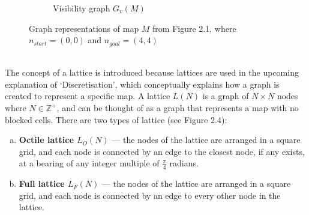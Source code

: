 \documentclass[12pt,notitlepage]{report}
\begin{document}
\begin{figure}
\begin{subfigure}{.5\textwidth}
    \caption{Visibility graph $G_{v}(M)$}
  \end{subfigure}
  \caption[Graph representations of map $M$]{Graph representations of map $M$ from Figure 2.1, where $n_{start} = (0,0)$ and $n_{goal} = (4,4)$}
\end{figure}

\\
\noindent
The concept of a lattice is introduced because lattices are used in the upcoming explanation of `Discretisation', which conceptually explains how a graph is created to represent a specific map. A lattice $L(N)$ is a graph of $N \times N$ nodes where $N \in\mathbb{Z^+}$, and can be thought of as a graph that represents a map with no blocked cells. There are two types of lattice (see Figure 2.4):\\

\begin{enumerate}[(a)]
\item{\bfseries Octile lattice $L_{O}(N)$} --- the nodes of the lattice are arranged in a square grid, and each node is connected by an edge to the closest node, if any exists, at a bearing of any integer multiple of $\frac{\pi}{4}$ radians.

\item{\bfseries Full lattice $L_{F}(N)$} --- the nodes of the lattice are arranged in a square grid, and each node is connected by an edge to every other node in the lattice.
\end{enumerate}
\end{document}
